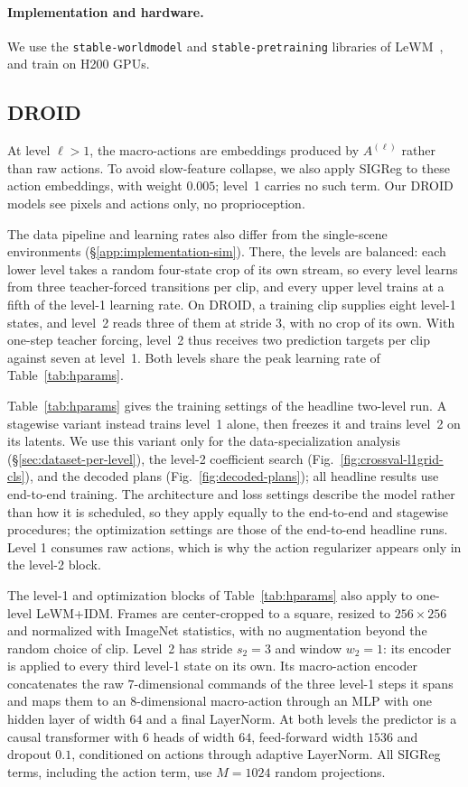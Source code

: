 \paragraph{Implementation and hardware.} We use the \texttt{stable-worldmodel} and
\texttt{stable-pretraining} libraries of LeWM~\citep{maes2026lewm}, and train
on H200 GPUs.

\subsection{DROID}
\label{app:hparams}

At level $\ell>1$, the macro-actions are embeddings produced by $A^{(\ell)}$ rather than raw
actions. To avoid slow-feature collapse, we also apply SIGReg to these action embeddings, with
weight $0.005$; level~1 carries no such term. Our DROID models see pixels and actions only, no proprioception.

The data pipeline and learning rates also differ from the single-scene environments
(\S\ref{app:implementation-sim}). There, the levels are balanced: each lower level takes a
random four-state crop of its own stream, so every level learns from three teacher-forced
transitions per clip, and every upper level trains at a fifth of the level-1 learning rate.
On DROID, a training clip supplies eight level-1 states, and level~2 reads three of them at
stride $3$, with no crop of its own. With one-step teacher forcing, level~2 thus receives two
prediction targets per clip against seven at level~1. Both levels share the peak learning
rate of Table~\ref{tab:hparams}.

Table~\ref{tab:hparams} gives the training settings of the headline two-level run.
A stagewise variant instead trains level~1 alone, then freezes it and trains level~2
on its latents. We use this variant only for the data-specialization analysis
(\S\ref{sec:dataset-per-level}), the level-2 coefficient search
(Fig.~\ref{fig:crossval-l1grid-cls}), and the decoded plans
(Fig.~\ref{fig:decoded-plans}); all headline results use end-to-end training.
The architecture and loss settings describe the model rather than how
it is scheduled, so they apply equally to the end-to-end and stagewise procedures;
the optimization settings are those of the end-to-end headline runs.
Level 1 consumes raw actions, which is why the action regularizer appears only in the level-2 block.

The level-1 and optimization blocks of Table~\ref{tab:hparams} also apply to one-level
LeWM+IDM. Frames are center-cropped to a square, resized to
$256{\times}256$ and normalized with ImageNet statistics, with no augmentation beyond the
random choice of clip. Level~2 has stride $s_2=3$ and window $w_2=1$: its encoder is
applied to every third level-1 state on its own. Its macro-action encoder concatenates
the raw $7$-dimensional commands of the three level-1 steps it spans and maps them to an
$8$-dimensional macro-action through an MLP with one hidden layer of width $64$ and a
final LayerNorm. At both levels the predictor is a
causal transformer with $6$ heads of width $64$, feed-forward width $1536$ and dropout
$0.1$, conditioned on actions through adaptive LayerNorm. All SIGReg terms, including the action term,
use $M=1024$ random projections.


